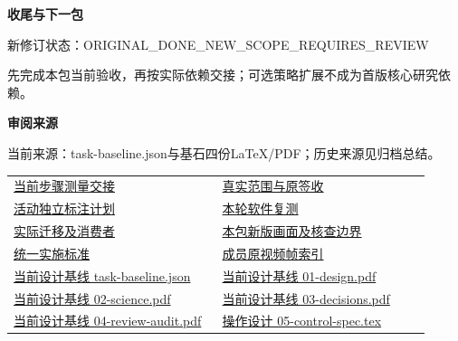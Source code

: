\documentclass[11pt,a4paper]{article}
\newcommand{\reviewsubsection}[1]{\par\Needspace{4\baselineskip}\vspace{4pt}\begin{center}{\titlelatin\titlecjk\bfseries\fontsize{12}{18}\selectfont #1}\end{center}}
\begin{document}
\reviewsubsection{3.3 收尾与下一包}
新修订状态：ORIGINAL\_\allowbreak{}DONE\_\allowbreak{}NEW\_\allowbreak{}SCOPE\_\allowbreak{}REQUIRES\_\allowbreak{}REVIEW


先完成本包当前验收，再按实际依赖交接；可选策略扩展不成为首版核心研究依赖。


\begin{minipage}{\linewidth}
\reviewsubsection{3.4 审阅来源}
当前来源：task-\allowbreak{}baseline.json与基石四份LaTeX/\allowbreak{}PDF；历史来源见归档总结。


\begingroup\small\setlength{\tabcolsep}{4pt}\begin{tabular}{@{}p{0.48\linewidth}p{0.48\linewidth}@{}}
\href{file:///D:/Agent/srp/agent/tasks/U12-02/outputs/current-measurement.md}{当前步骤测量交接} & \href{file:///D:/Agent/srp/agent/tasks/U12-02/outputs/current-measurement.json}{真实范围与原签收}\\[4pt]
\href{file:///D:/Agent/srp/agent/tasks/U12-02/outputs/annotation-plan.md}{活动独立标注计划} & \href{file:///D:/Agent/srp/agent/tasks/U12-02/evidence/verification.json}{本轮软件复测}\\[4pt]
\href{file:///D:/Agent/srp/agent/tasks/U12-02/evidence/consumer-impact.md}{实际迁移及消费者} & \href{file:///D:/Agent/srp/agent/tasks/U12-02/outputs/current-implementation-evidence.md}{本包新版画面及核查边界}\\[4pt]
\href{file:///D:/Agent/srp/agent/design/weather/2026-10-08_Storm\%E4\%B8\%8E\%E7\%BA\%AF\%E7\%B2\%92\%E5\%AD\%90\%E5\%8F\%8C\%E7\%8E\%AF\%E5\%AE\%9E\%E6\%96\%BD\%E6\%A0\%87\%E5\%87\%86.md}{统一实施标准} & \href{file:///D:/Agent/srp/human/assets/previews/2026-10-08/member-storm-particle-rings/frame-index.json}{成员原视频帧索引}\\[4pt]
\href{file:///D:/Agent/srp/agent/design/design-foundation-20261008/task-baseline.json}{当前设计基线 task-\allowbreak{}baseline.json} & \href{file:///D:/Agent/srp/agent/design/design-foundation-20261008/01-design.pdf}{当前设计基线 01-\allowbreak{}design.pdf}\\[4pt]
\href{file:///D:/Agent/srp/agent/design/design-foundation-20261008/02-science.pdf}{当前设计基线 02-\allowbreak{}science.pdf} & \href{file:///D:/Agent/srp/agent/design/design-foundation-20261008/03-decisions.pdf}{当前设计基线 03-\allowbreak{}decisions.pdf}\\[4pt]
\href{file:///D:/Agent/srp/agent/design/design-foundation-20261008/04-review-audit.pdf}{当前设计基线 04-\allowbreak{}review-\allowbreak{}audit.pdf} & \href{file:///D:/Agent/srp/agent/design/design-foundation-20261008/05-control-spec.tex}{操作设计 05-\allowbreak{}control-\allowbreak{}spec.tex}\\[4pt]

\end{tabular}
\end{minipage}
\end{document}
